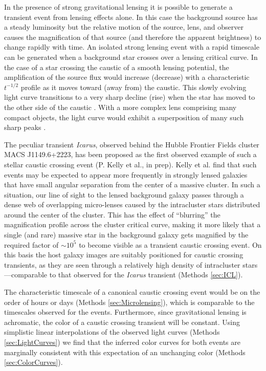 In the presence of strong gravitational lensing it is possible to
generate a transient event from lensing effects alone.  In this case
the background source has a steady luminosity but the relative motion
of the source, lens, and observer causes the magnification of that
source (and therefore the apparent brightness) to change rapidly with
time.  An isolated strong lensing event with a rapid timescale can be
generated when a background star crosses over a lensing critical
curve.  In the case of a star crossing the caustic of a smooth lensing
potential, the amplification of the source flux would increase
(decrease) with a characteristic $t^{-1/2}$ profile as it moves toward
(away from) the caustic. This slowly evolving light curve transitions
to a very sharp decline (rise) when the star has moved to the other
side of the caustic \citep{Schneider:1986, MiraldaEscude:1991}.  With
a more complex lens comprising many compact objects, the light curve
would exhibit a superposition of many such sharp peaks
\citep{Lewis:1993}.

The peculiar transient {\it Icarus}, observed behind the Hubble
Frontier Fields cluster MACS J1149.6+2223, has been proposed as the
first observed example of such a stellar caustic crossing event
(P. Kelly et al., in prep). Kelly et al. find that such events may be
expected to appear more frequently in strongly lensed galaxies that
have small angular separation from the center of a massive cluster. In
such a situation, our line of sight to the lensed background galaxy
passes through a dense web of overlapping micro-lenses caused by the
intracluster stars distributed around the center of the cluster. This
has the effect of ``blurring'' the magnification profile across the
cluster critical curve, making it more likely that a single (and rare)
massive star in the background galaxy gets magnified by the required
factor of $\sim10^5$ to become visible as a transient caustic crossing
event.  On this basis the \spock host galaxy images are suitably
positioned for caustic crossing transients, as they are seen through a
relatively high density of intracluster stars---comparable to that
observed for the {\it Icarus} transient (Methods \ref{sec:ICL}).

The characteristic timescale of a canonical caustic crossing event
would be on the order of hours or days (Methods
\ref{sec:Microlensing}), which is comparable to the timescales
observed for the \spock events. Furthermore, since gravitational
lensing is achromatic, the color of a caustic crossing transient will
be constant.  Using simplistic linear interpolations of the observed
light curves (Methods \ref{sec:LightCurves}) we find that the inferred
color curves for both \spock events are marginally consistent with
this expectation of an unchanging color (Methods
\ref{sec:ColorCurves}).

